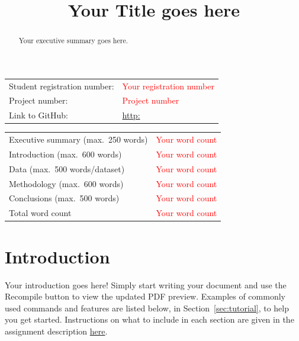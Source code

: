 \documentclass{article}
\title{Your Title goes here}
\begin{document}
\maketitle

\begin{table}[h]
    \centering
    \begin{tabular}{ll}
        Student registration number: & \textcolor{red}{Your registration number}\\
        Project number: & \textcolor{red}{Project number}\\
        Link to GitHub: & \url{http:}\\
    \end{tabular}
\end{table}



\begin{table}[h]
    \centering
    \begin{tabular}{lc}
        Executive summary (max.\ 250 words) & \textcolor{red}{Your word count}\\
        Introduction (max.\ 600 words) & \textcolor{red}{Your word count}\\
        Data (max.\ 500 words/dataset) & \textcolor{red}{Your word count}\\
        Methodology (max.\ 600 words) & \textcolor{red}{Your word count}\\
        Conclusions (max.\ 500 words) & \textcolor{red}{Your word count}\\
        \hline
        Total word count & \textcolor{red}{Your word count}\\
    \end{tabular}
\end{table}

\tableofcontents

\clearpage



\begin{abstract}
Your executive summary goes here.
\end{abstract}


\section{Introduction}

Your introduction goes here! Simply start writing your document and use the Recompile button to view the updated PDF preview. Examples of commonly used commands and features are listed below, in Section~\ref{sec:tutorial}, to help you get started. Instructions on what to include in each section are given in the assignment description \href{https://moodle.essex.ac.uk/draftfile.php/196919/user/draft/666046553/2021_CE888_Assignment_1.pdf}{here}.
\end{document}
